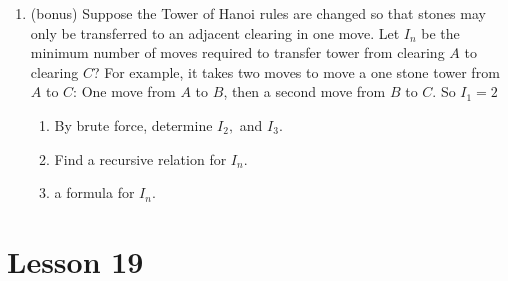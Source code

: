 \documentclass[11pt]{amsart}
\begin{document}
\begin{enumerate}
\item (bonus) Suppose the Tower of Hanoi rules are changed so that stones may only be transferred
to an adjacent clearing in one move. Let $I_n$ be  the minimum number of moves required 
to transfer tower from clearing $A$ to clearing $C$? 
For example, it takes two moves to move a one stone tower from $A$ to $C$: One move from $A$ to $B$, then a second move from $B$ to $C$. So $I_1 = 2$\\[3pt]

\begin{enumerate}
\item  By brute force, determine  $I_2,$ and $I_3$. \\[3pt]
 
\item Find a recursive relation for $I_n$.\\[3pt]

\item {} a formula for $I_n$.\\[5pt]

\end{enumerate}

\end{enumerate}

\section{Lesson 19}
\end{document}
